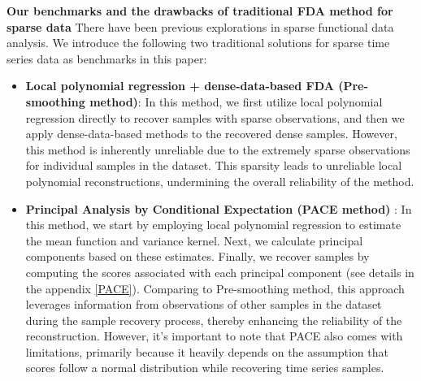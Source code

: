 \documentclass{article}
\begin{document}
\textbf{Our benchmarks and the drawbacks of traditional FDA method for sparse data}
There have been previous explorations in sparse functional data analysis. 
We introduce the following two traditional solutions for sparse time series data as benchmarks in this paper:
\begin{itemize}
  \item \textbf{Local polynomial regression + dense-data-based FDA (Pre-smoothing method)}: 
  In this method, we first utilize local polynomial regression directly to recover samples with sparse observations, 
  and then we apply dense-data-based methods to the recovered dense samples. 
  However, this method is inherently unreliable due to the extremely sparse observations for individual samples in the dataset. 
  This sparsity leads to unreliable local polynomial reconstructions, 
  undermining the overall reliability of the method.
  \item \textbf{Principal Analysis by Conditional Expectation (PACE method) }\cite{yao2005functional}: 
  In this method, we start by employing local polynomial regression to estimate the mean function and variance kernel. 
  Next, we calculate principal components based on these estimates. 
  Finally, we recover samples by computing the scores associated with each principal component (see details in the appendix \ref{PACE}).
  Comparing to Pre-smoothing method, this approach leverages information from observations of other samples in the dataset during the sample recovery process, 
  thereby enhancing the reliability of the reconstruction. 
  However, it's important to note that PACE also comes with limitations, primarily because it heavily depends on the assumption that scores follow a normal distribution while recovering time series samples.
\end{itemize}
\end{document}
